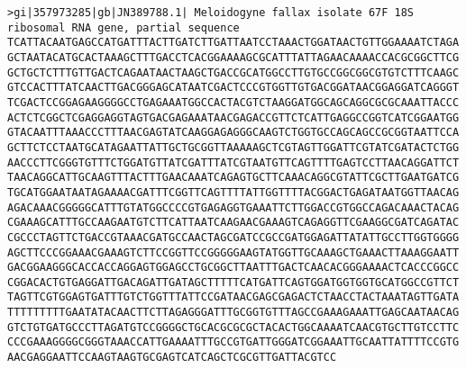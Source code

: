 \documentclass[11pt]{article}
\begin{document}
\begin{Verbatim}[commandchars=\\\{\}]
>gi|357973285|gb|JN389788.1| Meloidogyne fallax isolate 67F 18S ribosomal RNA gene, partial sequence
TCATTACAATGAGCCATGATTTACTTGATCTTGATTAATCCTAAACTGGATAACTGTTGGAAAATCTAGA
GCTAATACATGCACTAAAGCTTTGACCTCACGGAAAAGCGCATTTATTAGAACAAAACCACGCGGCTTCG
GCTGCTCTTTGTTGACTCAGAATAACTAAGCTGACCGCATGGCCTTGTGCCGGCGGCGTGTCTTTCAAGC
GTCCACTTTATCAACTTGACGGGAGCATAATCGACTCCCGTGGTTGTGACGGATAACGGAGGATCAGGGT
TCGACTCCGGAGAAGGGGCCTGAGAAATGGCCACTACGTCTAAGGATGGCAGCAGGCGCGCAAATTACCC
ACTCTCGGCTCGAGGAGGTAGTGACGAGAAATAACGAGACCGTTCTCATTGAGGCCGGTCATCGGAATGG
GTACAATTTAAACCCTTTAACGAGTATCAAGGAGAGGGCAAGTCTGGTGCCAGCAGCCGCGGTAATTCCA
GCTTCTCCTAATGCATAGAATTATTGCTGCGGTTAAAAAGCTCGTAGTTGGATTCGTATCGATACTCTGG
AACCCTTCGGGTGTTTCTGGATGTTATCGATTTATCGTAATGTTCAGTTTTGAGTCCTTAACAGGATTCT
TAACAGGCATTGCAAGTTTACTTTGAACAAATCAGAGTGCTTCAAACAGGCGTATTCGCTTGAATGATCG
TGCATGGAATAATAGAAAACGATTTCGGTTCAGTTTTATTGGTTTTACGGACTGAGATAATGGTTAACAG
AGACAAACGGGGGCATTTGTATGGCCCCGTGAGAGGTGAAATTCTTGGACCGTGGCCAGACAAACTACAG
CGAAAGCATTTGCCAAGAATGTCTTCATTAATCAAGAACGAAAGTCAGAGGTTCGAAGGCGATCAGATAC
CGCCCTAGTTCTGACCGTAAACGATGCCAACTAGCGATCCGCCGATGGAGATTATATTGCCTTGGTGGGG
AGCTTCCCGGAAACGAAAGTCTTCCGGTTCCGGGGGAAGTATGGTTGCAAAGCTGAAACTTAAAGGAATT
GACGGAAGGGCACCACCAGGAGTGGAGCCTGCGGCTTAATTTGACTCAACACGGGAAAACTCACCCGGCC
CGGACACTGTGAGGATTGACAGATTGATAGCTTTTTCATGATTCAGTGGATGGTGGTGCATGGCCGTTCT
TAGTTCGTGGAGTGATTTGTCTGGTTTATTCCGATAACGAGCGAGACTCTAACCTACTAAATAGTTGATA
TTTTTTTTTGAATATACAACTTCTTAGAGGGATTTGCGGTGTTTAGCCGAAAGAAATTGAGCAATAACAG
GTCTGTGATGCCCTTAGATGTCCGGGGCTGCACGCGCGCTACACTGGCAAAATCAACGTGCTTGTCCTTC
CCCGAAAGGGGCGGGTAAACCATTGAAAATTTGCCGTGATTGGGATCGGAAATTGCAATTATTTTCCGTG
AACGAGGAATTCCAAGTAAGTGCGAGTCATCAGCTCGCGTTGATTACGTCC


\end{Verbatim}
\end{document}
